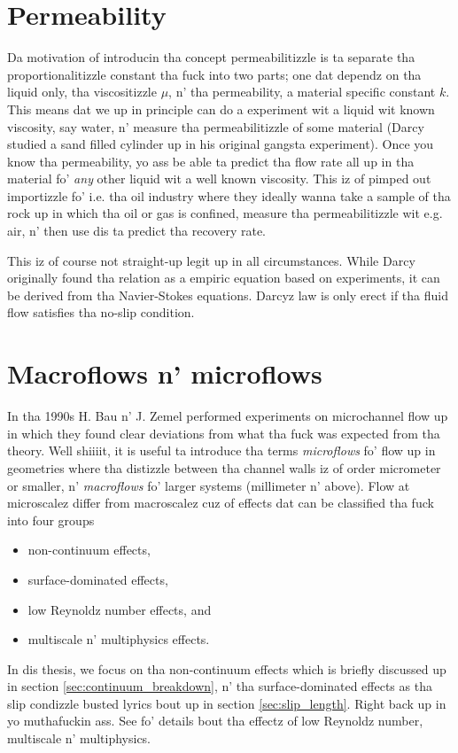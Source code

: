\section{Permeability}
\label{sec:permeability}
Da motivation of introducin tha concept permeabilitizzle is ta separate tha proportionalitizzle constant tha fuck into two parts; one dat dependz on tha liquid only, tha viscositizzle $\mu$, n' tha permeability, a material specific constant $k$. This means dat we up in principle can do a experiment wit a liquid wit known viscosity, say water, n' measure tha permeabilitizzle of some material (Darcy studied a sand filled cylinder up in his original gangsta experiment). Once you know tha permeability, yo ass be able ta predict tha flow rate all up in tha material fo' \textit{any} other liquid wit a well known viscosity. This iz of pimped out importizzle fo' i.e. tha oil industry where they ideally wanna take a sample of tha rock up in which tha oil or gas is confined, measure tha permeabilitizzle wit e.g. air, n' then use dis ta predict tha recovery rate.

This iz of course not straight-up legit up in all circumstances. While Darcy originally found tha relation as a empiric equation based on experiments, it can be derived from tha Navier-Stokes equations. Darcyz law is only erect if tha fluid flow satisfies tha no-slip condition.
\section{Macroflows n' microflows}
\label{sec:theory_of_fluids_microflows}
In tha 1990s H. Bau n' J. Zemel performed experiments on microchannel flow up in which they found clear deviations from what tha fuck was expected from tha theory\cite{karniadakis2005microflows}. Well shiiiit, it is useful ta introduce tha terms \textit{microflows} fo' flow up in geometries where tha distizzle between tha channel walls iz of order micrometer or smaller, n' \textit{macroflows} fo' larger systems (millimeter n' above). Flow at microscalez differ from macroscalez cuz of effects dat can be classified tha fuck into four groups
\begin{itemize}
\item non-continuum effects,
\item surface-dominated effects,
\item low Reynoldz number effects, and
\item multiscale n' multiphysics effects.
\end{itemize}
In dis thesis, we focus on tha non-continuum effects which is briefly discussed up in section \ref{sec:continuum_breakdown}, n' tha surface-dominated effects as tha slip condizzle busted lyrics bout up in section \ref{sec:slip_length}. Right back up in yo muthafuckin ass. See \cite{karniadakis2005microflows} fo' details bout tha effectz of low Reynoldz number, multiscale n' multiphysics. 

